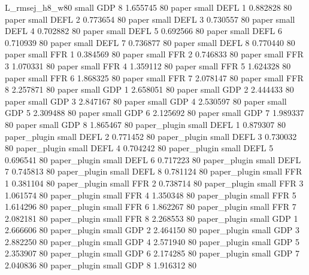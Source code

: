 L_rmsej_h8_w80      small      GDP                 8 1.655745 80
         paper      small     DEFL                 1 0.882828 80
         paper      small     DEFL                 2 0.773654 80
         paper      small     DEFL                 3 0.730557 80
         paper      small     DEFL                 4 0.702882 80
         paper      small     DEFL                 5 0.692566 80
         paper      small     DEFL                 6 0.710939 80
         paper      small     DEFL                 7 0.736877 80
         paper      small     DEFL                 8 0.770440 80
         paper      small      FFR                 1 0.384569 80
         paper      small      FFR                 2 0.746833 80
         paper      small      FFR                 3 1.070331 80
         paper      small      FFR                 4 1.359112 80
         paper      small      FFR                 5 1.624328 80
         paper      small      FFR                 6 1.868325 80
         paper      small      FFR                 7 2.078147 80
         paper      small      FFR                 8 2.257871 80
         paper      small      GDP                 1 2.658051 80
         paper      small      GDP                 2 2.444433 80
         paper      small      GDP                 3 2.847167 80
         paper      small      GDP                 4 2.530597 80
         paper      small      GDP                 5 2.309488 80
         paper      small      GDP                 6 2.125692 80
         paper      small      GDP                 7 1.989337 80
         paper      small      GDP                 8 1.865467 80
  paper_plugin      small     DEFL                 1 0.879307 80
  paper_plugin      small     DEFL                 2 0.771452 80
  paper_plugin      small     DEFL                 3 0.730032 80
  paper_plugin      small     DEFL                 4 0.704242 80
  paper_plugin      small     DEFL                 5 0.696541 80
  paper_plugin      small     DEFL                 6 0.717223 80
  paper_plugin      small     DEFL                 7 0.745813 80
  paper_plugin      small     DEFL                 8 0.781124 80
  paper_plugin      small      FFR                 1 0.381104 80
  paper_plugin      small      FFR                 2 0.738714 80
  paper_plugin      small      FFR                 3 1.061574 80
  paper_plugin      small      FFR                 4 1.350348 80
  paper_plugin      small      FFR                 5 1.614296 80
  paper_plugin      small      FFR                 6 1.862267 80
  paper_plugin      small      FFR                 7 2.082181 80
  paper_plugin      small      FFR                 8 2.268553 80
  paper_plugin      small      GDP                 1 2.666606 80
  paper_plugin      small      GDP                 2 2.464150 80
  paper_plugin      small      GDP                 3 2.882250 80
  paper_plugin      small      GDP                 4 2.571940 80
  paper_plugin      small      GDP                 5 2.353907 80
  paper_plugin      small      GDP                 6 2.174285 80
  paper_plugin      small      GDP                 7 2.040836 80
  paper_plugin      small      GDP                 8 1.916312 80